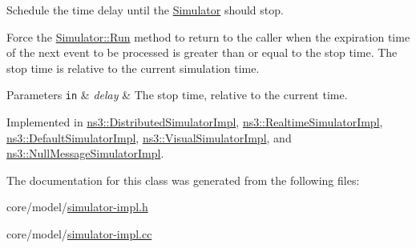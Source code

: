 Schedule the time delay until the \hyperlink{classns3_1_1Simulator}{Simulator} should stop.

Force the \hyperlink{classns3_1_1Simulator_a84be982e6d03b62c3dc3303c75a9b909}{Simulator\+::\+Run} method to return to the caller when the expiration time of the next event to be processed is greater than or equal to the stop time. The stop time is relative to the current simulation time. 
\begin{DoxyParams}[1]{Parameters}
\mbox{\tt in}  & {\em delay} & The stop time, relative to the current time. \\
\hline
\end{DoxyParams}


Implemented in \hyperlink{classns3_1_1DistributedSimulatorImpl_ac5c3ff4918441cb0671ecd8d5d54d7df}{ns3\+::\+Distributed\+Simulator\+Impl}, \hyperlink{classns3_1_1RealtimeSimulatorImpl_a771b84498d01a1be74a21a8058d9481c}{ns3\+::\+Realtime\+Simulator\+Impl}, \hyperlink{classns3_1_1DefaultSimulatorImpl_a2fbb62a5fc30f2bc09fe68a6346eab79}{ns3\+::\+Default\+Simulator\+Impl}, \hyperlink{classns3_1_1VisualSimulatorImpl_a5775514649d2804248339e040fe67683}{ns3\+::\+Visual\+Simulator\+Impl}, and \hyperlink{classns3_1_1NullMessageSimulatorImpl_a1216d19d0217c35d58704f64ae728c13}{ns3\+::\+Null\+Message\+Simulator\+Impl}.



The documentation for this class was generated from the following files\+:\begin{DoxyCompactItemize}
\item 
core/model/\hyperlink{simulator-impl_8h}{simulator-\/impl.\+h}\item 
core/model/\hyperlink{simulator-impl_8cc}{simulator-\/impl.\+cc}\end{DoxyCompactItemize}
